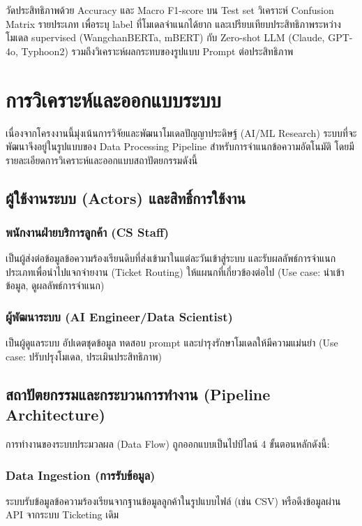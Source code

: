 วัดประสิทธิภาพด้วย Accuracy และ Macro F1-score บน Test set วิเคราะห์ Confusion Matrix รายประเภท เพื่อระบุ label ที่โมเดลจำแนกได้ยาก และเปรียบเทียบประสิทธิภาพระหว่างโมเดล supervised (WangchanBERTa, mBERT) กับ Zero-shot LLM (Claude, GPT-4o, Typhoon2) รวมถึงวิเคราะห์ผลกระทบของรูปแบบ Prompt ต่อประสิทธิภาพ


\section{การวิเคราะห์และออกแบบระบบ}

เนื่องจากโครงงานนี้มุ่งเน้นการวิจัยและพัฒนาโมเดลปัญญาประดิษฐ์ (AI/ML Research) ระบบที่จะพัฒนาจึงอยู่ในรูปแบบของ Data Processing Pipeline สำหรับการจำแนกข้อความอัตโนมัติ โดยมีรายละเอียดการวิเคราะห์และออกแบบสถาปัตยกรรมดังนี้

\subsection{ผู้ใช้งานระบบ (Actors) และสิทธิ์การใช้งาน}

\subsubsection{พนักงานฝ่ายบริการลูกค้า (CS Staff)}
เป็นผู้ส่งต่อข้อมูลข้อความร้องเรียนดิบที่ส่งเข้ามาในแต่ละวันเข้าสู่ระบบ และรับผลลัพธ์การจำแนกประเภทเพื่อนำไปแจกจ่ายงาน (Ticket Routing) ให้แผนกที่เกี่ยวข้องต่อไป (Use case: นำเข้าข้อมูล, ดูผลลัพธ์การจำแนก)

\subsubsection{ผู้พัฒนาระบบ (AI Engineer/Data Scientist)}
เป็นผู้ดูแลระบบ อัปเดตชุดข้อมูล ทดสอบ prompt และบำรุงรักษาโมเดลให้มีความแม่นยำ (Use case: ปรับปรุงโมเดล, ประเมินประสิทธิภาพ)

\subsection{สถาปัตยกรรมและกระบวนการทำงาน (Pipeline Architecture)}
การทำงานของระบบประมวลผล (Data Flow) ถูกออกแบบเป็นไปป์ไลน์ 4 ขั้นตอนหลักดังนี้:

\subsubsection{Data Ingestion (การรับข้อมูล)}
ระบบรับข้อมูลข้อความร้องเรียนจากฐานข้อมูลลูกค้าในรูปแบบไฟล์ (เช่น CSV) หรือดึงข้อมูลผ่าน API จากระบบ Ticketing เดิม

